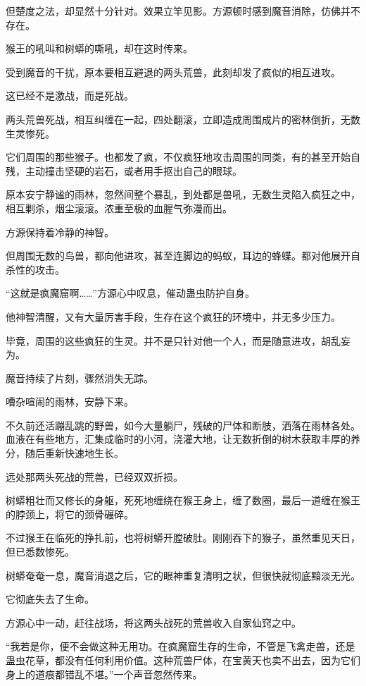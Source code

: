 \begin{this_body}
但楚度之法，却显然十分针对。效果立竿见影。方源顿时感到魔音消除，仿佛并不存在。

猴王的吼叫和树蟒的嘶吼，却在这时传来。

受到魔音的干扰，原本要相互避退的两头荒兽，此刻却发了疯似的相互进攻。

这已经不是激战，而是死战。

两头荒兽死战，相互纠缠在一起，四处翻滚，立即造成周围成片的密林倒折，无数生灵惨死。

它们周围的那些猴子。也都发了疯，不仅疯狂地攻击周围的同类，有的甚至开始自残，主动撞击坚硬的岩石，或者用手抠出自己的眼球。

原本安宁静谧的雨林，忽然间整个暴乱，到处都是兽吼，无数生灵陷入疯狂之中，相互剿杀，烟尘滚滚。浓重至极的血腥气弥漫而出。

方源保持着冷静的神智。

但周围无数的鸟兽，都向他进攻，甚至连脚边的蚂蚁，耳边的蜂蝶。都对他展开自杀性的攻击。

“这就是疯魔窟啊……”方源心中叹息，催动蛊虫防护自身。

他神智清醒，又有大量厉害手段，生存在这个疯狂的环境中，并无多少压力。

毕竟，周围的这些疯狂的生灵。并不是只针对他一个人，而是随意进攻，胡乱妄为。

魔音持续了片刻，骤然消失无踪。

嘈杂喧闹的雨林，安静下来。

不久前还活蹦乱跳的野兽，如今大量躺尸，残破的尸体和断肢，洒落在雨林各处。血液在有些地方，汇集成临时的小河，浇灌大地，让无数折倒的树木获取丰厚的养分，随后重新快速地生长。

远处那两头死战的荒兽，已经双双折损。

树蟒粗壮而又修长的身躯，死死地缠绕在猴王身上，缠了数圈，最后一道缠在猴王的脖颈上，将它的颈骨碾碎。

不过猴王在临死的挣扎前，也将树蟒开膛破肚。刚刚吞下的猴子，虽然重见天日，但已悉数惨死。

树蟒奄奄一息，魔音消退之后，它的眼神重复清明之状，但很快就彻底黯淡无光。

它彻底失去了生命。

方源心中一动，赶往战场，将这两头战死的荒兽收入自家仙窍之中。

“我若是你，便不会做这种无用功。在疯魔窟生存的生命，不管是飞禽走兽，还是蛊虫花草，都没有任何利用价值。这种荒兽尸体，在宝黄天也卖不出去，因为它们身上的道痕都错乱不堪。”一个声音忽然传来。


\end{this_body}
